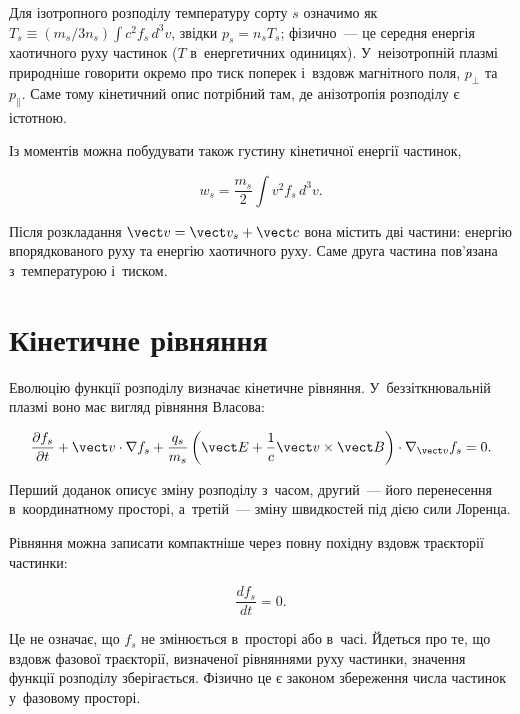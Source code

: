 Для ізотропного розподілу температуру сорту $s$ означимо як
$T_s\equiv(m_s/3n_s)\int c^2f_s\,d^3v$, звідки $p_s=n_sT_s$; фізично~--- це середня енергія
хаотичного руху частинок ($T$ в~енергетичних одиницях). У~неізотропній плазмі природніше говорити окремо про тиск поперек і~вздовж
магнітного поля, $p_\perp$ та $p_\parallel$. Саме тому кінетичний опис потрібний там, де
анізотропія розподілу є істотною.

Із моментів можна побудувати також густину кінетичної енергії частинок,

\begin{equation}\label{eq:kinetic-energy-density}
 w_s=\frac{m_s}{2}\int v^2 f_s\,d^3v.
\end{equation}

Після розкладання $\vect v=\vect v_s+\vect c$ вона містить дві частини: енергію
впорядкованого руху та енергію хаотичного руху. Саме друга частина пов'язана
з~температурою і~тиском.

\section{Кінетичне рівняння}

Еволюцію функції розподілу визначає кінетичне рівняння. У~беззіткнювальній плазмі воно має
вигляд рівняння Власова:

\begin{equation}\label{eq:vlasov}
\frac{\partial f_s}{\partial t}
+\vect v\cdot\nabla f_s
+\frac{q_s}{m_s}
\left(
\vect E+\frac1c\vect v\times\vect B
\right)
\cdot\nabla_{\vect v}f_s=0.
\end{equation}

Перший доданок описує зміну розподілу з~часом, другий~--- його перенесення в~координатному
просторі, а~третій~--- зміну швидкостей під дією сили Лоренца.

Рівняння можна записати компактніше через повну похідну вздовж траєкторії частинки:

\begin{equation}\label{eq:vlasov-characteristic}
\frac{d f_s}{dt}=0.
\end{equation}

Це не означає, що $f_s$ не змінюється в~просторі або в~часі. Йдеться про те, що вздовж
фазової траєкторії, визначеної рівняннями руху частинки, значення функції розподілу
зберігається. Фізично це є законом збереження числа частинок у~фазовому просторі.


